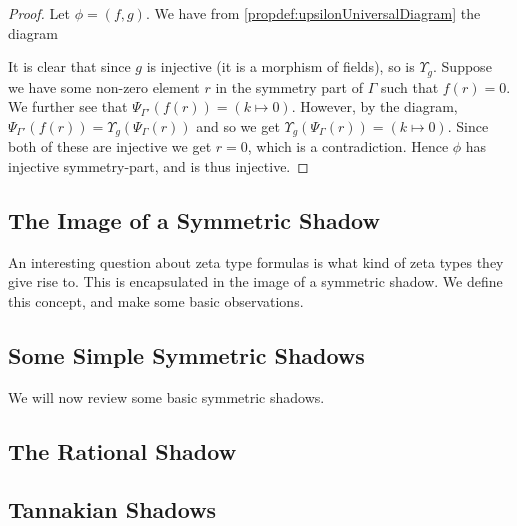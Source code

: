 \begin{proof}
  Let $\phi = (f, g)$. We have from \ref{propdef:upsilonUniversalDiagram} the diagram
  \begin{center}
  \end{center}
  It is clear that since $g$ is injective (it is a morphism of fields), so is $\Upsilon_{g}$. Suppose we have some non-zero element $r$ in the symmetry part of $\Gamma$ such that $f(r) = 0$. We further see that $\Psi_{\Gamma'}(f(r)) = (k \mapsto 0)$. However, by the diagram, $\Psi_{\Gamma'}(f(r)) = \Upsilon_g(\Psi_{\Gamma}(r))$ and so we get $\Upsilon_g(\Psi_{\Gamma}(r)) = (k \mapsto 0)$. Since both of these are injective we get $r = 0$, which is a contradiction. Hence $\phi$ has injective symmetry-part, and is thus injective. \qedhere
\end{proof}

\subsection{The Image of a Symmetric Shadow}
An interesting question about zeta type formulas is what kind of zeta types they give rise to. This is encapsulated in the image of a symmetric shadow. We define this concept, and make some basic observations.

\subsection{Some Simple Symmetric Shadows}
We will now review some basic symmetric shadows.

\subsection{The Rational Shadow}

\subsection{Tannakian Shadows}
